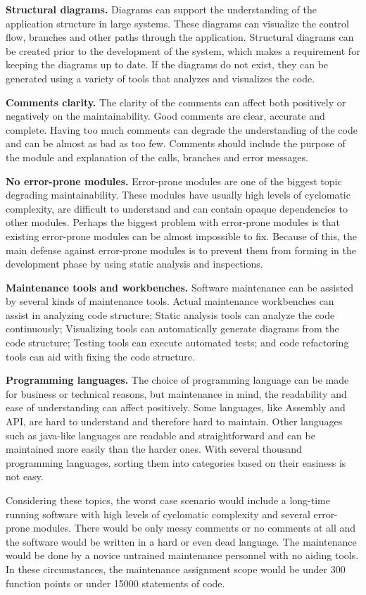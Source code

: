 \textbf{Structural diagrams.} Diagrams can support the understanding of the application structure in large systems. These diagrams can visualize the control flow, branches and other paths through the application. Structural diagrams can be created prior to the development of the system, which makes a requirement for keeping the diagrams up to date. If the diagrams do not exist, they can be generated using a variety of tools that analyzes and visualizes the code.

\textbf{Comments clarity.} The clarity of the comments can affect both positively or negatively on the maintainability. Good comments are clear, accurate and complete. Having too much comments can degrade the understanding of the code and can be almost as bad as too few. Comments should include the purpose of the module and explanation of the calls, branches and error messages.

\textbf{No error-prone modules.} Error-prone modules are one of the biggest topic degrading maintainability. These modules have usually high levels of cyclomatic complexity, are difficult to understand and can contain opaque dependencies to other modules. Perhaps the biggest problem with error-prone modules is that existing error-prone modules can be almost impossible to fix. Because of this, the main defense against error-prone modules is to prevent them from forming in the development phase by using static analysis and inspections.

\textbf{Maintenance tools and workbenches.} Software maintenance can be assisted by several kinds of maintenance tools. Actual maintenance workbenches can assist in analyzing code structure; Static analysis tools can analyze the code continuously; Visualizing tools can automatically generate diagrams from the code structure; Testing tools can execute automated tests; and code refactoring tools can aid with fixing the code structure.

\textbf{Programming languages.} The choice of programming language can be made for business or technical reasons, but maintenance in mind, the readability and ease of understanding can affect positively. Some languages, like Assembly and API, are hard to understand and therefore hard to maintain. Other languages such as java-like languages are readable and straightforward and can be maintained more easily than the harder ones. With several thousand programming languages, sorting them into categories based on their easiness is not easy.

Considering these topics, the worst case scenario would include a long-time running software with high levels of cyclomatic complexity and several error-prone modules. There would be only messy comments or no comments at all and the software would be written in a hard or even dead language. The maintenance would be done by a novice untrained maintenance personnel with no aiding tools. In these circumstances, the maintenance assignment scope would be under 300 function points or under 15000 statements of code.

